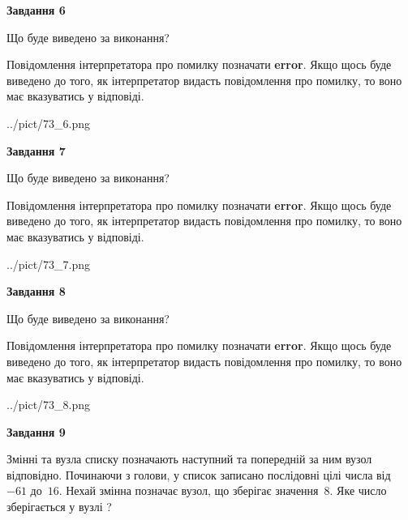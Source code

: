 \documentclass[12pt, ukrainian]{article}
\begin{document}
{\begin {large}
{\begin {center}\textbf{Завдання 6}\end {center}}\par
Що буде виведено за виконання?

Повідомлення інтерпретатора про помилку позначати \textbf{error}.
Якщо щось буде виведено до того, як інтерпретатор видасть повідомлення про помилку, 
то воно має вказуватись у відповіді. \par


\begin{center}
	{../pict/73_6.png}
\end{center}
\newpage

{\begin {center}\textbf{Завдання 7}\end {center}}\par
Що буде виведено за виконання?

Повідомлення інтерпретатора про помилку позначати \textbf{error}.
Якщо щось буде виведено до того, як інтерпретатор видасть повідомлення про помилку, 
то воно має вказуватись у відповіді. \par


\begin{center}
	{../pict/73_7.png}
\end{center}
\newpage

{\begin {center}\textbf{Завдання 8}\end {center}}\par
Що буде виведено за виконання?

Повідомлення інтерпретатора про помилку позначати \textbf{error}.
Якщо щось буде виведено до того, як інтерпретатор видасть повідомлення про помилку, 
то воно має вказуватись у відповіді. \par


\begin{center}
	{../pict/73_8.png}
\end{center}
\newpage

{\begin {center}\textbf{Завдання 9}\end {center}}\par
Змінні  та  вузла списку позначають наступний та попередній за ним вузол відповідно. Починаючи з голови, у список записано послідовні цілі числа від~$-61$ до~$16$. Нехай змінна  позначає вузол, що зберігає значення~$8$.
Яке число зберігається у вузлі  ?\par
\newpage


\end{large}}
\end{document}
